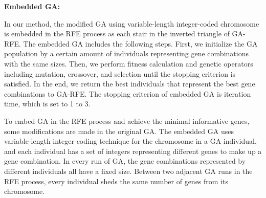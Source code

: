 \documentclass[10pt,journal,compsoc]{IEEEtran}
\begin{document}
	\noindent\textbf{Embedded GA:}
	
	In our method, the modified GA using variable-length integer-coded chromosome is embedded in the RFE process as each stair in the inverted triangle of GA-RFE. The embedded GA includes the following steps. First, we initialize the GA population by a certain amount of individuals representing gene combinations with the same sizes. Then, we perform fitness calculation and genetic operators including mutation, crossover, and selection until the stopping criterion is satisfied. In the end, we return the best individuals that represent the best gene combinations to GA-RFE. The stopping criterion of embedded GA is iteration time, which is set to 1 to 3.
	
	To embed GA in the RFE process and achieve the minimal informative genes, some modifications are made in the original GA. The embedded GA uses variable-length integer-coding technique for the chromosome in a GA individual, and each individual has a set of integers representing different genes to make up a gene combination. In every run of GA, the gene combinations represented by different individuals all have a fixed size. Between two adjacent GA runs in the RFE process, every individual sheds the same number of genes from its chromosome.
	
\end{document}
